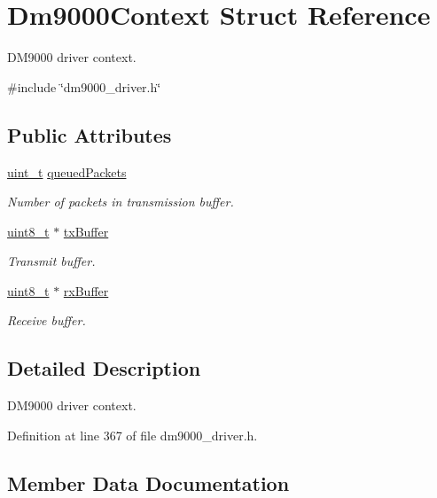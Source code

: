 \hypertarget{structDm9000Context}{}\section{Dm9000\+Context Struct Reference}
\label{structDm9000Context}


D\+M9000 driver context.  




{\ttfamily \#include \char`\"{}dm9000\+\_\+driver.\+h\char`\"{}}

\subsection*{Public Attributes}
\begin{DoxyCompactItemize}
\item 
\hyperlink{compiler__port_8h_a12a1e9b3ce141648783a82445d02b58d}{uint\+\_\+t} \hyperlink{structDm9000Context_a332bc804390a37a5f2447d9e76c600c8}{queued\+Packets}
\begin{DoxyCompactList}\small\item\em Number of packets in transmission buffer. \end{DoxyCompactList}\item 
\hyperlink{stdint_8h_aba7bc1797add20fe3efdf37ced1182c5}{uint8\+\_\+t} $\ast$ \hyperlink{structDm9000Context_a72e4ef12dece5a9596fbadb0bcc22418}{tx\+Buffer}
\begin{DoxyCompactList}\small\item\em Transmit buffer. \end{DoxyCompactList}\item 
\hyperlink{stdint_8h_aba7bc1797add20fe3efdf37ced1182c5}{uint8\+\_\+t} $\ast$ \hyperlink{structDm9000Context_accdec387715282c04559710494cd0066}{rx\+Buffer}
\begin{DoxyCompactList}\small\item\em Receive buffer. \end{DoxyCompactList}\end{DoxyCompactItemize}


\subsection{Detailed Description}
D\+M9000 driver context. 

Definition at line 367 of file dm9000\+\_\+driver.\+h.



\subsection{Member Data Documentation}
\mbox{\label{structDm9000Context_a332bc804390a37a5f2447d9e76c600c8}} 

